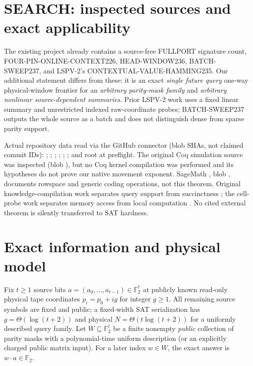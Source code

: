 \documentclass[10pt]{article}
\newcommand{\F}{\mathbb F_2}
\begin{document}
\section{SEARCH: inspected sources and exact applicability}
The existing project already contains a source-free FULLPORT signature count, FOUR-PIN-ONLINE-CONTEXT226, HEAD-WINDOW236, BATCH-SWEEP237, and LSPV-2's CONTEXTUAL-VALUE-HAMMING235. Our additional statement differs from these: it is an exact \emph{single future query} one-way physical-window frontier for an \emph{arbitrary parity-mask family} and \emph{arbitrary nonlinear source-dependent summaries}. Prior LSPV-2 work uses a fixed linear summary and unrestricted indexed raw-coordinate probes; BATCH-SWEEP237 outputs the whole source as a batch and does not distinguish dense from sparse parity support.

Actual repository data read via the GitHub connector (blob SHAs, not claimed commit IDs):  ;  ;  ;  ;  ;  ; and root   at preflight. The original Coq simulation source  was inspected (blob ), but no Coq kernel compilation was performed and its hypotheses do not prove our native movement exponent. SageMath , blob , documents rowspace and generic coding operations, not this theorem. Original knowledge-compilation work separates query support from succinctness \cite{dm}; the cell-probe work separates memory access from local computation \cite{fs,pd}. No cited external theorem is silently transferred to SAT hardness.

\section{Exact information and physical model}
Fix $t\ge1$ source bits $a=(a_0,\dots,a_{t-1})\in\F^t$ at publicly known read-only physical tape coordinates $p_i=p_0+ig$ for integer $g\ge1$. All remaining source symbols are fixed and public; a fixed-width SAT serialization has $g=\Theta(\log(t+2))$ and physical $N=\Theta(t\log(t+2))$ for a uniformly described query family. Let $W\subseteq\F^t$ be a finite nonempty \emph{public} collection of parity masks with a polynomial-time uniform description (or an explicitly charged public matrix input). For a later index $w\in W$, the exact answer is $w\cdot a\in\F$.
\end{document}
